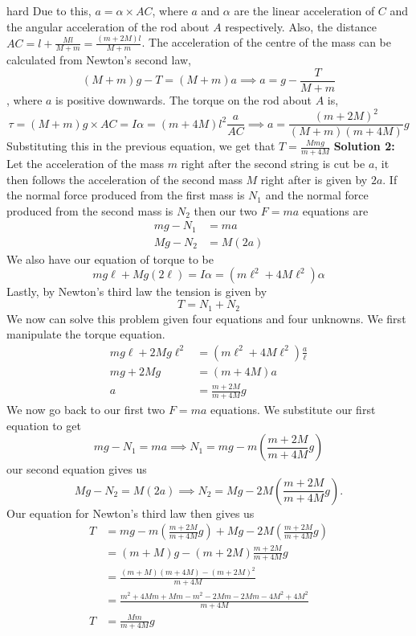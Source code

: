 \begin{solution}{hard}
Due to this, $a = \alpha \times AC$, where $a$ and $\alpha$ are the linear acceleration of $C$ and the angular acceleration of the rod about $A$ respectively.
Also, the distance $AC = l+\frac{Ml}{M+m} = \frac{(m+2M)l}{M+m}$. The acceleration of the centre of the mass can be calculated from Newton's second law, 
\[(M+m)g - T = (M+m)a \implies a = g - \frac{T}{M+m}\], where $a$ is positive downwards.
The torque on the rod about $A$ is, 
\[
\tau = (M+m)g\times AC = I \alpha = (m+4M)l^2\frac{a}{AC} \implies a= \frac{(m+2M)^2}{(M+m)(m+4M)}g\]
Substituting this in the previous equation, we get that $\boxed{T = \frac{Mmg}{m+4M}}$
\tcbline
\textbf{Solution 2:} Let the acceleration of the mass $m$ right after the second string is cut be $a$, it then follows the acceleration of the second mass $M$ right after is given by $2a$. If the normal force produced from the first mass is $N_1$ and the normal force produced from the second mass is $N_2$ then our two $F=ma$ equations are
\begin{align*}
mg - N_1 &= ma\\
Mg - N_2 &= M(2a)
\end{align*}We also have our equation of torque to be
\[mg\ell + Mg(2\ell) = I\alpha = (m\ell^2 + 4M\ell^2)\alpha\]Lastly, by Newton's third law the tension is given by
\[T = N_1 + N_2\]We now can solve this problem given four equations and four unknowns. We first manipulate the torque equation.
\begin{align*}
mg\ell + 2Mg\ell^2 &= (m\ell^2 + 4M\ell^2)\frac{a}{\ell}\\
mg + 2Mg &= (m + 4M)a\\
a &= \frac{m + 2M}{m + 4M}g
\end{align*}We now go back to our first two $F=ma$ equations. We substitute our first equation to get
\[mg - N_1 = ma \implies N_1 = mg - m\left(\frac{m+2M}{m + 4M}g\right) \]our second equation gives us
\[Mg - N_2 = M(2a) \implies N_2 = Mg - 2M\left(\frac{m + 2M}{m + 4M}g\right).\]Our equation for Newton's third law then gives us
\begin{align*}
T &= mg - m\left(\frac{m+2M}{m + 4M}g\right) + Mg - 2M\left(\frac{m + 2M}{m + 4M}g\right)\\
&= (m + M)g - (m + 2M)\frac{m + 2M}{m + 4M}g\\
&= \frac{(m + M)(m + 4M) - (m + 2M)^2}{m + 4M}\\
&= \frac{m^2 + 4Mm + Mm - m^2 - 2Mm - 2Mm - 4M^2 + 4M^2}{m + 4M}\\
T &= \boxed{\frac{Mm}{m + 4M}g}
\end{align*}
\end{solution}

